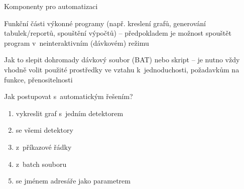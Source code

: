 \documentclass{beamer}
\begin{document}
\begin{frame}{Komponenty pro automatizaci}
  \begin{block}{Funkční části}
    výkonné programy (např. kreslení grafů, generování tabulek/reportů, spouštění výpočtů) -- předpokladem je možnost spouštět program v~neinteraktivním (dávkovém) režimu
  \end{block}
  \pause
  \begin{block}{Jak to slepit dohromady}
    dávkový soubor (BAT) nebo skript -- je nutno vždy vhodně volit použité prostředky ve vztahu k~jednoduchosti, požadavkům na funkce, přenositelnosti
  \end{block}
\end{frame}

\begin{frame}{Jak postupovat s~automatickým řešením?}
  \begin{enumerate}
    \item vykreslit graf s~jedním detektorem
    \pause
    \item se všemi detektory
    \pause
    \item z~příkazové řádky
    \pause
    \item z~batch souboru
    \pause
    \item se jménem adresáře jako parametrem
  \end{enumerate}
\end{frame}
\end{document}
